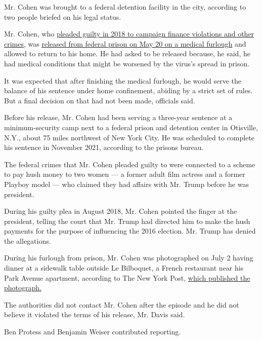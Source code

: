 Mr. Cohen was brought to a federal detention facility in the city,
according to two people briefed on his legal status.

Mr. Cohen, who
\href{https://slack-redir.net/link?url=https\%3A\%2F\%2Fwww.nytimes.com\%2F2018\%2F08\%2F21\%2Fnyregion\%2Fmichael-cohen-guilty-plea-trump-takeaways.html}{pleaded
guilty in 2018 to campaign finance violations and other crimes}, was
\href{https://www.nytimes.com/2020/05/20/nyregion/michael-cohen-coronavirus-prison-release.html}{released
from federal prison on May 20 on a medical furlough} and allowed to
return to his home. He had asked to be released because, he said, he had
medical conditions that might be worsened by the virus's spread in
prison.

It was expected that after finishing the medical furlough, he would
serve the balance of his sentence under home confinement, abiding by a
strict set of rules. But a final decision on that had not been made,
officials said.

Before his release, Mr. Cohen had been serving a three-year sentence at
a minimum-security camp next to a federal prison and detention center in
Otisville, N.Y., about 75 miles northwest of New York City. He was
scheduled to complete his sentence in November 2021, according to the
prisons bureau.

The federal crimes that Mr. Cohen pleaded guilty to were connected to a
scheme to pay hush money to two women --- a former adult film actress
and a former Playboy model --- who claimed they had affairs with Mr.
Trump before he was president.

During his guilty plea in August 2018, Mr. Cohen pointed the finger at
the president, telling the court that Mr. Trump had directed him to make
the hush payments for the purpose of influencing the 2016 election. Mr.
Trump has denied the allegations.

During his furlough from prison, Mr. Cohen was photographed on July 2
having dinner at a sidewalk table outside Le Bilboquet, a French
restaurant near his Park Avenue apartment, according to The New York
Post,
\href{https://nypost.com/2020/07/03/michael-cohen-eating-at-nyc-restaurant-could-land-him-back-in-prison/}{which
published the photograph.}

The authorities did not contact Mr. Cohen after the episode and he did
not believe it violated the terms of his release, Mr. Davis said.

Ben Protess and Benjamin Weiser contributed reporting.

